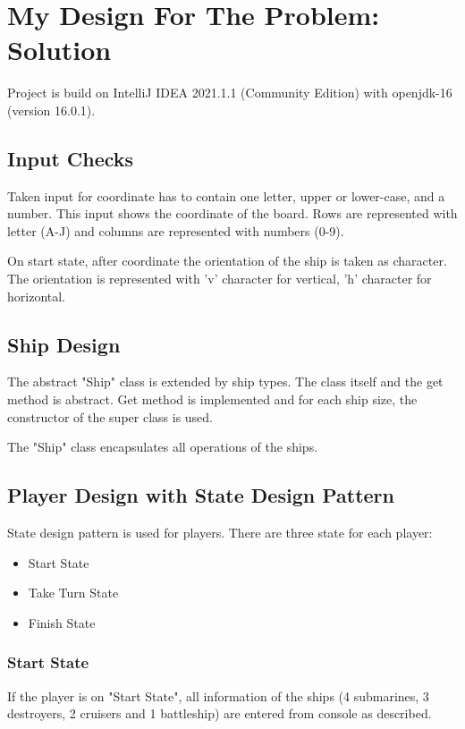 \documentclass{article}
\begin{document}
	
	
\newpage
\section{My Design For The Problem: Solution}

Project is build on IntelliJ IDEA 2021.1.1 (Community Edition) with openjdk-16 (version 16.0.1).

	\subsection{Input Checks}
	Taken input for coordinate has to contain one letter, upper or lower-case, and a number. This input shows
	the coordinate of the board. Rows are represented with letter (A-J) and columns are represented with numbers (0-9).

	On start state, after coordinate the orientation of the ship is taken as character. The orientation is 
	represented with 'v' character for vertical, 'h' character for horizontal.	

	\subsection{Ship Design}
	The abstract "Ship" class is extended by ship types. 
	The class itself and the get method is abstract. Get method is implemented and for each ship size, 
	the constructor of the super class is used.

	The "Ship" class encapsulates all operations of the ships. 

	\subsection{Player Design with State Design Pattern}

	State design pattern is used for players. 
	There are three state for each player:
	\begin{itemize}
		\item Start State
		\item Take Turn State
		\item Finish State
	\end{itemize}

		\newpage
		\subsubsection{Start State}
		If the player is on "Start State", all information of the ships (4 submarines, 3 destroyers, 2 cruisers
		and 1 battleship) are entered from console as described. 
\end{document}
